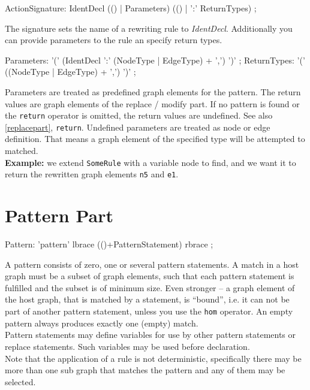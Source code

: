 \begin{rail}  
  ActionSignature: IdentDecl (() | Parameters) (() | ':' ReturnTypes) ;
\end{rail}
The signature sets the name of a rewriting rule to \emph{IdentDecl}. Additionally you can provide parameters to the rule an specify return types.

\begin{rail}
  Parameters: '(' (IdentDecl ':' (NodeType | EdgeType) + ',') ')' ;
  ReturnTypes: '(' ((NodeType | EdgeType) + ',') ')' ;
\end{rail}
Parameters are treated as predefined graph elements for the pattern. The return values are graph elements of the replace / modify part. If no pattern is found or the \texttt{return} operator is omitted, the return values are undefined. See also \ref{replacepart}, \texttt{return}. Undefined parameters are treated as node or edge definition. That means a graph element of the specified type will be attempted to matched.\\
{\small \textbf{Example:} we extend \texttt{SomeRule} with a variable node to find, and we want it to return the rewritten graph elements \texttt{n5} and \texttt{e1}.}
\begin{grgen}
  rule SomeRuleExt(varnode: Node): (Node, EdgeTypeB) {
    pattern{
      varnode;
      n1: NodeTypeA;
      ...
    }
    replace {
      varnode;
      ...  
      return(n5, e1);
      eval {
        ...
\end{grgen}

\section{Pattern Part}
\label{patternpart}
\begin{rail}
  Pattern: 'pattern' lbrace (()+PatternStatement) rbrace ;
\end{rail}
A pattern consists of zero, one or several pattern statements. A match in a host graph must be a subset of graph elements, such that each pattern statement is fulfilled and the subset is of minimum size. Even stronger -- a graph element of the host graph, that is matched by a statement, is ``bound'', i.e. it can not be part of another pattern statement, unless you use the \texttt{hom} operator. An empty pattern always produces exactly one (empty) match.\\
Pattern statements may define variables for use by other pattern statements or replace statements. Such variables may be used before declaration.\\
Note that the application of a rule is not deterministic, specifically there may be more than one sub graph that matches the pattern and any of them may be selected.


